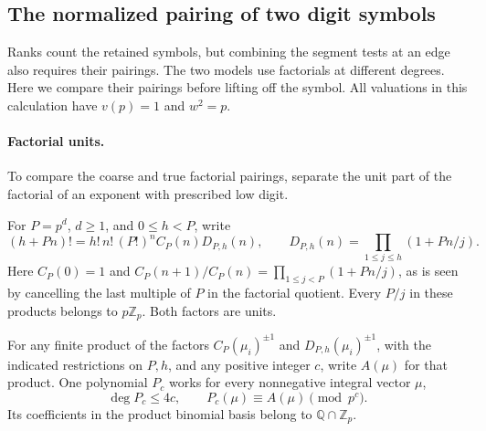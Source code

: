 \subsection{The normalized pairing of two digit symbols}
\label{sec:block-pairing}
\hypertarget{source-block-pairing}{}

Ranks count the retained symbols, but combining the segment tests at an edge also requires their pairings. The two models use factorials at different degrees. Here we
compare their pairings before lifting off the symbol. All
valuations in this calculation have \(v(p)=1\) and \(w^2=p\).

\paragraph{Factorial units.}

To compare the coarse and true factorial pairings, separate the unit part of the factorial of an exponent with prescribed low digit.

For \(P=p^d\), \(d\ge1\), and \(0\le h<P\), write
\[
 (h+Pn)!=h!\,n!\,(P!)^n C_P(n)D_{P,h}(n),\qquad
 D_{P,h}(n)=\prod_{1\le j\le h}(1+Pn/j).
\]
Here \(C_P(0)=1\) and
\(C_P(n+1)/C_P(n)=\prod_{1\le j<P}(1+Pn/j)\),
as is seen by cancelling the last multiple of \(P\) in the
factorial quotient. Every \(P/j\) in these products belongs
to \(p\mathbb Z_p\). Both factors are units.

\begin{lemma}
\label{lem:factorial-unit-polynomial}
For any finite product of the factors \(C_P(\mu_i)^{\pm1}\) and
\(D_{P,h}(\mu_i)^{\pm1}\), with the indicated restrictions on \(P,h\),
and any positive integer \(c\), write \(A(\mu)\) for that product. One polynomial \(P_c\) works for every nonnegative integral vector \(\mu\),
\[
 \deg P_c\le4c,\qquad P_c(\mu)\equiv A(\mu)\pmod{p^c}.
\]
 Its coefficients in the product
binomial basis belong to \(\mathbb Q\cap\mathbb Z_p\).
\end{lemma}

